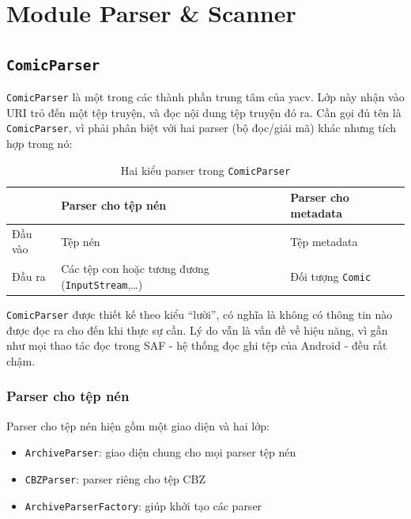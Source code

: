 \documentclass[../../../../thesis]{subfiles}
\begin{document}
\section{Module Parser \& Scanner}\label{sec:module-parser-scanner}



\subsection{\texttt{ComicParser}}

\texttt{ComicParser} là một trong các thành phần trung tâm của yacv. Lớp này
nhận vào URI trỏ đến một tệp truyện, và đọc nội dung tệp truyện đó ra. Cần gọi
đủ tên là \texttt{ComicParser}, vì phải phân biệt với hai parser (bộ đọc/giải
mã) khác nhưng tích hợp trong nó:

\begin{table}[H]
    \centering
    \caption{Hai kiểu parser trong \texttt{ComicParser}}
    \label{tab:2-parsers}
    \begin{tabular}{l p{6cm} l}
        \toprule
                & Parser cho tệp nén & Parser cho metadata \\
        \midrule
        Đầu vào & Tệp nén            & Tệp metadata \\
        Đầu ra  & Các tệp con hoặc tương đương (\texttt{InputStream},\ldots) & Đối tượng \texttt{Comic} \\
        \bottomrule
    \end{tabular}
\end{table}

\texttt{ComicParser} được thiết kế theo kiểu ``lười'', có nghĩa là không có
thông tin nào được đọc ra cho đến khi thực sự cần. Lý do vẫn là vấn đề về hiệu
năng, vì gần như mọi thao tác đọc trong SAF - hệ thống đọc ghi tệp của Android -
đều rất chậm.

\subsubsection{Parser cho tệp nén}

Parser cho tệp nén hiện gồm một giao diện và hai lớp:

\begin{itemize}
    \item
        \texttt{ArchiveParser}: giao diện chung cho mọi parser tệp nén
    \item
        \texttt{CBZParser}: parser riêng cho tệp CBZ
    \item
        \texttt{ArchiveParserFactory}: giúp khởi tạo các parser
\end{itemize}
\end{document}
